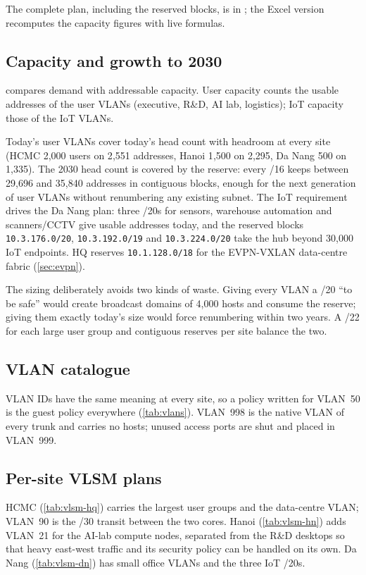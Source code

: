 The complete plan, including the reserved blocks, is in ; the Excel version
 recomputes the capacity figures with live formulas.

\subsection{Capacity and growth to 2030}\label{sec:ip-capacity}
 compares demand with addressable capacity. User capacity counts the usable addresses of
the user VLANs (executive, R\&D, AI lab, logistics); IoT capacity those of the IoT VLANs.



Today's user VLANs cover today's head count with headroom at every site (HCMC 2{,}000 users on 2{,}551
addresses, Hanoi 1{,}500 on 2{,}295, Da Nang 500 on 1{,}335). The 2030 head count is covered by the reserve:
every /16 keeps between 29{,}696 and 35{,}840 addresses in contiguous blocks, enough for the next
generation of user VLANs without renumbering any existing subnet. The IoT requirement drives the Da Nang plan: three /20s for
sensors, warehouse automation and scanners/CCTV give \FactIotCapacityDanang{} usable addresses today, and
the reserved blocks \texttt{10.3.176.0/20}, \texttt{10.3.192.0/19} and \texttt{10.3.224.0/20} take the hub
beyond 30{,}000 IoT endpoints. HQ reserves \texttt{10.1.128.0/18} for the EVPN-VXLAN data-centre fabric
(\cref{sec:evpn}).

The sizing deliberately avoids two kinds of waste. Giving every VLAN a /20 ``to be safe'' would create
broadcast domains of 4{,}000 hosts and consume the reserve; giving them exactly today's size would force
renumbering within two years. A /22 for each large user group and contiguous reserves per site balance
the two.

\subsection{VLAN catalogue}\label{sec:ip-vlans}
VLAN IDs have the same meaning at every site, so a policy written for VLAN~50 is the guest policy
everywhere (\cref{tab:vlans}). VLAN~998 is the native VLAN of every trunk and carries no hosts; unused
access ports are shut and placed in VLAN~999.


\subsection{Per-site VLSM plans}\label{sec:ip-vlsm}
HCMC (\cref{tab:vlsm-hq}) carries the largest user groups and the data-centre VLAN; VLAN~90 is the /30 transit
between the two cores. Hanoi (\cref{tab:vlsm-hn}) adds VLAN~21 for the AI-lab compute nodes, separated
from the R\&D desktops so that heavy east-west traffic and its security policy can be handled on its own.
Da Nang (\cref{tab:vlsm-dn}) has small office VLANs and the three IoT /20s.

